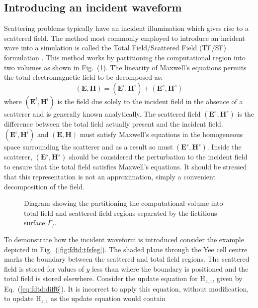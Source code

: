 \documentclass[a4paper, 12pt]{article}
\newcommand{\eq}[1]{Eq.\ (\ref{#1})}
\newcommand{\rfig}[1]{Fig.\ (\ref{#1})}
\begin{document}
	\subsection{Introducing an incident waveform}
	\label{sec:fdtd:incwave}
	Scattering problems typically have
	an incident illumination which gives rise to a scattered field. The
	method most commonly employed to introduce an incident wave into a
	simulation is called the Total Field/Scattered Field (TF/SF)
	formulation
	\cite{mur81ieeetransemc377,umashankar82ieeetransemc397}. This method
	works by partitioning the computational region into two volumes as
	shown in \rfig{fig:fdtd:tfsf}. The linearity of Maxwell's equations
	permits the total electromagnetic field to be decomposed as:
	\begin{equation}
		(\mathbf{E},\mathbf{H}) = (\mathbf{E}^i,\mathbf{H}^i) + (\mathbf{E}^s,\mathbf{H}^s)\nonumber
	\end{equation}
	where $(\mathbf{E}^i,\mathbf{H}^i)$ is the field due solely to the
	incident field in the absence of a scatterer and is generally known
	analytically. The scattered field $(\mathbf{E}^s,\mathbf{H}^s)$ is the
	difference between the total field actually present and the incident
	field. $(\mathbf{E}^i,\mathbf{H}^i)$ and $(\mathbf{E},\mathbf{H})$
	must satisfy Maxwell's equations in the homogeneous space surrounding
	the scatterer and as a result so must
	$(\mathbf{E}^s,\mathbf{H}^s)$. Inside the scatterer,
	$(\mathbf{E}^s,\mathbf{H}^s)$ should be considered the perturbation to
	the incident field to ensure that the total field satisfies Maxwell's
	equations. It should be stressed that this
	representation is not an approximation, simply a convenient
	decomposition of the field.
	\begin{figure}[!h]
		\centering
		\caption{Diagram showing the partitioning the computational volume
			into total field and scattered field regions separated by the
			fictitious surface $\Gamma_f$.}
		\label{fig:fdtd:tfsf}
	\end{figure}
	To demonstrate how the incident waveform is introduced consider the
	example depicted in \rfig{fig:fdtd:tfsfeg}. The shaded plane through
	the Yee cell centre marks the boundary between the scattered and total
	field regions. The scattered field is stored for values of $y$ less than
	where the boundary is positioned and the total field is stored
	elsewhere. Consider the update equation for H$_{z,1}$, given by
	\eq{eq:fdtd:diff6}. It is incorrect to apply this equation, without
	modification, to update H$_{z,1}$ as the update equation would contain
\end{document}
